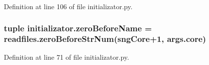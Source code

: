 Definition at line 106 of file initializator.\-py.

\hypertarget{a00135_a475e51ace78f2490aa4206915d0e3ae6}{
\subsubsection[{zero\-Before\-Name}]{\setlength{\rightskip}{0pt plus 5cm}tuple initializator.\-zero\-Before\-Name = readfiles.\-zero\-Before\-Str\-Num(sng\-Core+1, args.\-core)}}\label{a00135_a475e51ace78f2490aa4206915d0e3ae6}


Definition at line 71 of file initializator.\-py.

